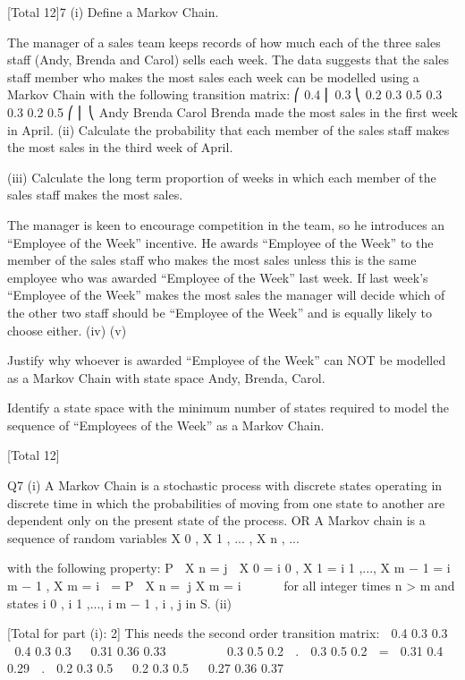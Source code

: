 \documentclass[a4paper,12pt]{article}
\begin{document}
[Total 12]7
(i)
Define a Markov Chain.

The manager of a sales team keeps records of how much each of the three sales staff
(Andy, Brenda and Carol) sells each week. The data suggests that the sales staff
member who makes the most sales each week can be modelled using a Markov Chain
with the following transition matrix:
⎛ 0.4
⎜ 0.3
⎝ 0.2
0.3
0.5
0.3
0.3
0.2
0.5
⎛
⎜
⎝
Andy
Brenda
Carol
Brenda made the most sales in the first week in April.
(ii) Calculate the probability that each member of the sales staff makes the most
sales in the third week of April.

(iii) Calculate the long term proportion of weeks in which each member of the
sales staff makes the most sales.

The manager is keen to encourage competition in the team, so he introduces an
“Employee of the Week” incentive. He awards “Employee of the Week” to the
member of the sales staff who makes the most sales unless this is the same employee
who was awarded “Employee of the Week” last week. If last week’s “Employee of
the Week” makes the most sales the manager will decide which of the other two staff
should be “Employee of the Week” and is equally likely to choose either.
(iv)
(v)

Justify why whoever is awarded “Employee of the Week” can NOT be
modelled as a Markov Chain with state space {Andy, Brenda, Carol}.

Identify a state space with the minimum number of states required to model
the sequence of “Employees of the Week” as a Markov Chain.

[Total 12]


Q7
(i)
A Markov Chain is a stochastic process 
with discrete states operating in discrete time 
in which the probabilities of moving from one state to another are
dependent only on the present state of the process. 
OR
A Markov chain is a sequence of random variables X 0 , X 1 , ... , X n , ...

with the following property:
P  X n = j  X 0 =
i 0 , X 1 =
i 1 ,..., X m − 1 =
i m − 1 , X m =
i  = P  X n =
j X m =
i 




for all integer times n > m and states i 0 , i 1 ,..., i m − 1 , i , j in S.
(ii)


[Total for part (i): 2]
This needs the second order transition matrix:
 0.4 0.3 0.3   0.4 0.3 0.3   0.31 0.36 0.33 


 

 0.3 0.5 0.2  .  0.3 0.5 0.2  =  0.31 0.4 0.29  .
 0.2 0.3 0.5   0.2 0.3 0.5   0.27 0.36 0.37 


 

\end{document}
